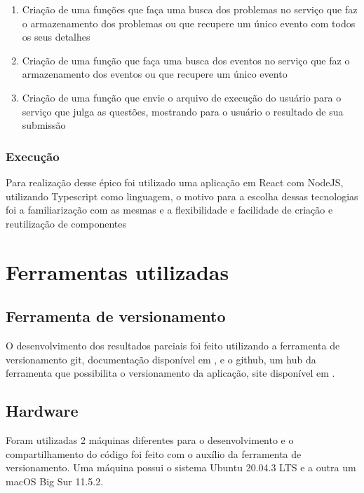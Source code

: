 \begin{enumerate}
          \begin{enumerate}
              \item Criação de uma funções que faça uma busca dos problemas no serviço que faz o armazenamento dos problemas ou que recupere um único evento com todos os seus detalhes
              \item Criação de uma função que faça uma busca dos eventos no serviço que faz o armazenamento dos eventos ou que recupere um único evento
              \item Criação de uma função que envie o arquivo de execução do usuário para o serviço que julga as questões, mostrando para o usuário o resultado de sua submissão
          \end{enumerate}
\end{enumerate}

\subsubsection{Execução}

Para realização desse épico foi utilizado uma aplicação em React com NodeJS, utilizando Typescript como linguagem, o motivo para a escolha dessas tecnologias foi a familiarização com as mesmas e a flexibilidade e facilidade de criação e reutilização de componentes

\section{Ferramentas utilizadas}

\subsection{Ferramenta de versionamento}

O desenvolvimento dos resultados parciais foi feito utilizando a ferramenta de versionamento git, documentação disponível em \cite{doc:git}, e o github, um hub da ferramenta que possibilita o versionamento da aplicação, site disponível em \cite{github}.

\subsection{Hardware}

Foram utilizadas 2 máquinas diferentes para o desenvolvimento e o compartilhamento do código foi feito com o auxílio da ferramenta de versionamento. Uma máquina possui o sistema Ubuntu 20.04.3 LTS e a outra um macOS Big Sur 11.5.2.


